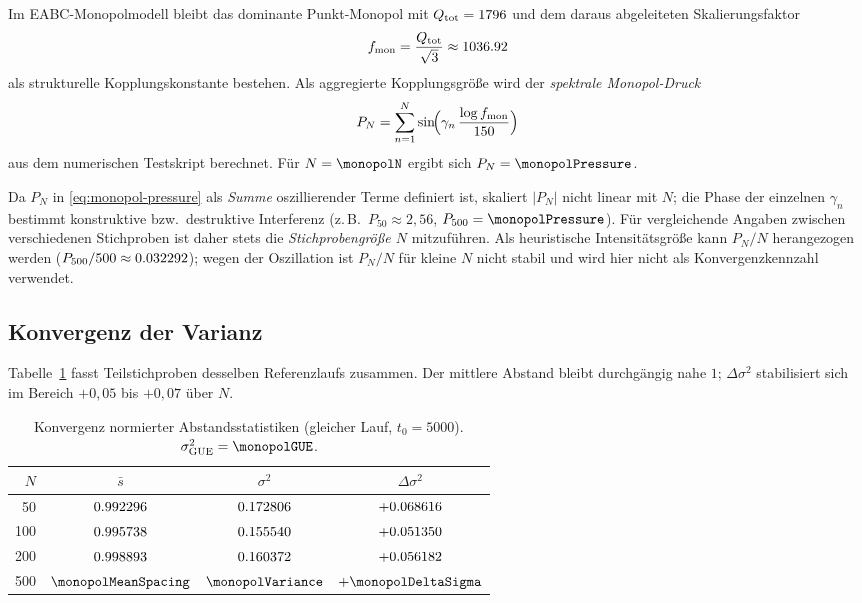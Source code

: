 Im EABC-Monopolmodell bleibt das dominante Punkt-Monopol mit
$Q_{\mathrm{tot}} = 1796$ und dem daraus abgeleiteten Skalierungsfaktor
\begin{equation}
  f_{\mathrm{mon}} = \frac{Q_{\mathrm{tot}}}{\sqrt{3}} \approx 1036.92
  \label{eq:monopol-factor}
\end{equation}
als strukturelle Kopplungskonstante bestehen.
Als aggregierte Kopplungsgröße wird der \emph{spektrale Monopol-Druck}
\begin{equation}
  P_N = \sum_{n=1}^{N} \sin\!\Bigl(\gamma_n \,\frac{\log f_{\mathrm{mon}}}{150}\Bigr)
  \label{eq:monopol-pressure}
\end{equation}
aus dem numerischen Testskript berechnet.
Für $N=\monopolN$ ergibt sich $P_N = \monopolPressure$.

Da $P_N$ in \eqref{eq:monopol-pressure} als \emph{Summe} oszillierender Terme definiert ist,
skaliert $|P_N|$ nicht linear mit $N$; die Phase der einzelnen $\gamma_n$ bestimmt
konstruktive bzw.\ destruktive Interferenz
(z.\,B.\ $P_{50}\approx 2{,}56$, $P_{500}=\monopolPressure$).
Für vergleichende Angaben zwischen verschiedenen Stichproben ist daher stets die
\emph{Stichprobengröße $N$} mitzuführen.
Als heuristische Intensitätsgröße kann $P_N/N$ herangezogen werden
($P_{500}/500 \approx 0.032292$); wegen der Oszillation ist $P_N/N$
für kleine $N$ nicht stabil und wird hier nicht als Konvergenzkennzahl verwendet.

\subsection{Konvergenz der Varianz}

Tabelle~\ref{tab:varianz-konvergenz} fasst Teilstichproben desselben Referenzlaufs
zusammen. Der mittlere Abstand bleibt durchgängig nahe $1$; $\Delta\sigma^2$ stabilisiert
sich im Bereich $+0{,}05$ bis $+0{,}07$ über $N$.

\begin{table}[htbp]
\centering
\caption{Konvergenz normierter Abstandsstatistiken (gleicher Lauf, $t_0=5000$).
$\sigma^2_{\mathrm{GUE}} = \monopolGUE$.}
\label{tab:varianz-konvergenz}
\begin{tabular}{rccc}
\toprule
$N$ & $\bar{s}$ & $\sigma^2$ & $\Delta\sigma^2$ \\
\midrule
50   & $0.992296$      & $0.172806$      & $+0.068616$      \\
100  & $0.995738$     & $0.155540$     & $+0.051350$     \\
200  & $0.998893$  & $0.160372$  & $+0.056182$  \\
500  & $\monopolMeanSpacing$  & $\monopolVariance$    & $+\monopolDeltaSigma$    \\
\bottomrule
\end{tabular}
\end{table}

